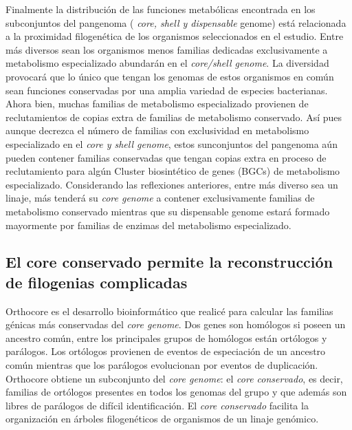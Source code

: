 \documentclass[]{article}
\begin{document}
Finalmente la distribución de las funciones metabólicas encontrada en
los subconjuntos del pangenoma ( \emph{core, shell y dispensable}
genome) está relacionada a la proximidad filogenética de los organismos
seleccionados en el estudio. Entre más diversos sean los organismos
menos familias dedicadas exclusivamente a metabolismo especializado
abundarán en el \emph{core/shell genome}. La diversidad provocará que lo
único que tengan los genomas de estos organismos en común sean funciones
conservadas por una amplia variedad de especies bacterianas. Ahora bien,
muchas familias de metabolismo especializado provienen de reclutamientos
de copias extra de familias de metabolismo conservado. Así pues aunque
decrezca el número de familias con exclusividad en metabolismo
especializado en el \emph{core y shell genome}, estos sunconjuntos del
pangenoma aún pueden contener familias conservadas que tengan copias
extra en proceso de reclutamiento para algún Cluster biosintético de
genes (BGCs) de metabolismo especializado. Considerando las reflexiones
anteriores, entre más diverso sea un linaje, más tenderá su \emph{core
genome} a contener exclusivamente familias de metabolismo conservado
mientras que su dispensable genome estará formado mayormente por
familias de enzimas del metabolismo especializado.

\subsection{El core conservado permite la reconstrucción de filogenias
complicadas}\label{el-core-conservado-permite-la-reconstruccion-de-filogenias-complicadas}

Orthocore es el desarrollo bioinformático que realicé para calcular las
familias génicas más conservadas del \emph{core genome}. Dos genes son
homólogos si poseen un ancestro común, entre los principales grupos de
homólogos están ortólogos y parálogos. Los ortólogos provienen de
eventos de especiación de un ancestro común mientras que los parálogos
evolucionan por eventos de duplicación. Orthocore obtiene un subconjunto
del \emph{core genome}: el \emph{core conservado}, es decir, familias de
ortólogos presentes en todos los genomas del grupo y que además son
libres de parálogos de difícil identificación. El \emph{core conservado}
facilita la organización en árboles filogenéticos de organismos de un
linaje genómico.
\end{document}
